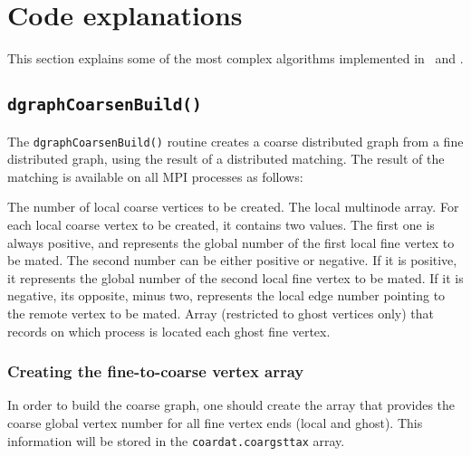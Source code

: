 
\section{Code explanations}
\label{sec-code}

This section explains some of the most complex algorithms implemented
in \scotch\ and \ptscotch.

\subsection{\texttt{dgraphCoarsenBuild()}}

The \texttt{dgraphCoarsenBuild()} routine creates a coarse distributed
graph from a fine distributed graph, using the result of a distributed
matching. The result of the matching is available on all MPI processes
as follows:
\begin{itemize}
  The number of local coarse vertices to be created.
  The local multinode array. For each local coarse vertex to be
  created, it contains two values. The first one is always positive,
  and represents the global number of the first local fine vertex to
  be mated. The second number can be either positive or negative. If
  it is positive, it represents the global number of the second local
  fine vertex to be mated. If it is negative, its opposite, minus two,
  represents the local edge number pointing to the remote vertex to be
  mated.
  Array (restricted to ghost vertices only) that records on which
  process is located each ghost fine vertex.
\end{itemize}

\subsubsection{Creating the fine-to-coarse vertex array}

In order to build the coarse graph, one should create the array that
provides the coarse global vertex number for all fine vertex ends
(local and ghost). This information will be stored in the
\texttt{coardat.\lbt coargsttax} array.

